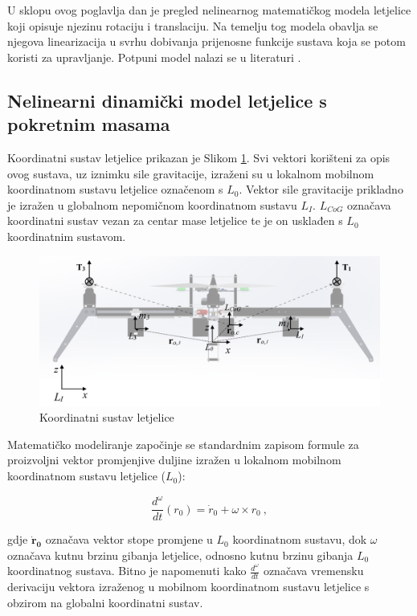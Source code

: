 \documentclass[11pt,a4paper]{article}
\begin{document}
U sklopu ovog poglavlja dan je pregled nelinearnog matematičkog modela letjelice koji opisuje njezinu rotaciju i translaciju. Na temelju tog modela obavlja se njegova linearizacija u svrhu dobivanja prijenosne funkcije sustava koja se potom koristi za upravljanje. Potpuni model nalazi se u literaturi \cite{haus3}.

\medskip

\subsection{Nelinearni dinamički model letjelice s pokretnim masama}

Koordinatni sustav letjelice prikazan je Slikom \ref{fig:mod}. Svi vektori korišteni za opis ovog sustava, uz iznimku sile gravitacije, izraženi su u lokalnom mobilnom koordinatnom sustavu letjelice označenom s $L_{0}$. Vektor sile gravitacije prikladno je izražen u globalnom nepomičnom koordinatnom sustavu $L_{I}$. $L_{CoG}$ označava koordinatni sustav vezan za centar mase letjelice te je on usklađen s $L_{0}$ koordinatnim sustavom.


\begin{figure}[H]
	\centering
	\includegraphics[scale=0.23]{model}
	\caption{Koordinatni sustav letjelice}
	\label{fig:mod}
\end{figure}

Matematičko modeliranje započinje se standardnim zapisom formule za proizvoljni vektor promjenjive duljine izražen u lokalnom mobilnom koordinatnom sustavu letjelice ($L_{0}$):

\begin{equation}
\frac{d^{\omega}}{dt}({r}_{0}) =  {\dot{r}}_{0} + {\omega} \times {r}_{0} \ , 
\label{eq:r0}
\end{equation}

gdje $\boldsymbol{\dot{r}_{0}}$ označava vektor stope promjene u $L_{0}$ koordinatnom sustavu, dok $\omega$  označava kutnu brzinu gibanja letjelice, odnosno kutnu brzinu gibanja $L_{0}$ koordinatnog sustava. Bitno je napomenuti kako $\frac{d^{\omega}}{dt}$ označava vremensku derivaciju vektora izraženog u mobilnom koordinatnom sustavu letjelice s obzirom na globalni koordinatni sustav. 
\end{document}
